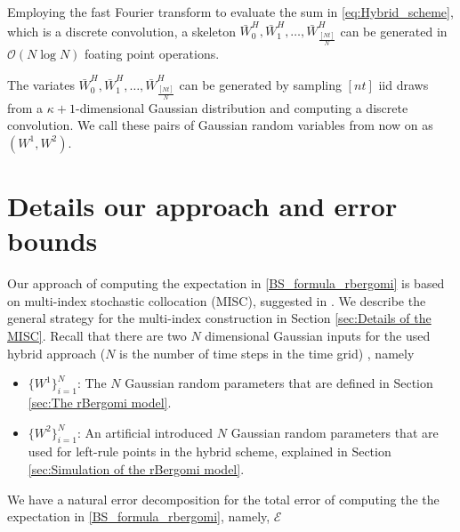 \documentclass[11pt]{article}
\newcommand{\Ordo}[1]{{\mathcal{O}}\left(#1\right)}
\begin{document}
Employing the fast Fourier transform to evaluate the sum in \eqref{eq:Hybrid_scheme}, which is a discrete convolution, a skeleton $\bar{W}_0^{H},\bar{W}_1^{H},\dots,\bar{W}_{\frac{[Nt]}{N}}^{H}$ can be generated in $\Ordo{N \log N}$ foating point operations.


The variates $\bar{W}_0^{H},\bar{W}_1^{H},\dots,\bar{W}_{\frac{[Nt]}{N}}^{H}$ can be generated by sampling $[nt]$ iid draws from a $\kappa+1$-dimensional Gaussian
distribution and computing a discrete convolution. We call these pairs  of Gaussian random variables from now on as $(W^1,W^2)$.
%



\section{Details our approach and error bounds}\label{sec:Details our approach and error bounds}



Our approach of computing the expectation in \eqref{BS_formula_rbergomi} is based on multi-index stochastic collocation (MISC), suggested in \cite{haji2016multi}. We describe the general strategy for the multi-index construction in Section \ref{sec:Details of the MISC}. Recall that  there are two  $N$ dimensional Gaussian inputs for the used  hybrid  approach ($N$ is the number of time steps in  the time grid) , namely
\begin{itemize}
	\item $\{W^1\}_{i=1}^N$: The $N$ Gaussian random parameters that are defined in Section  \ref{sec:The rBergomi model}.
	\item $\{W^2\}_{i=1}^N$: An artificial introduced $N$ Gaussian random parameters that are used for left-rule points in the hybrid scheme, explained in Section  \ref{sec:Simulation of the rBergomi model}.
\end{itemize}

We have a natural error decomposition for the total error of computing the the expectation in \eqref{BS_formula_rbergomi}, namely, $\mathcal{E}$
\end{document}
